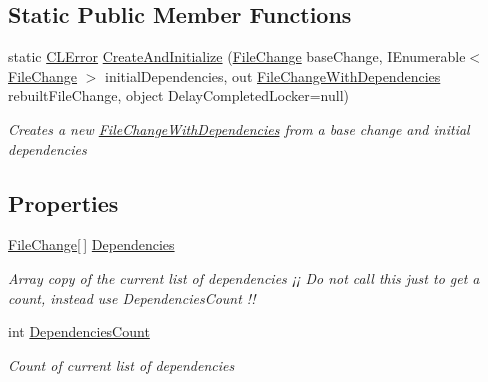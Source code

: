 \subsection*{Static Public Member Functions}
\begin{DoxyCompactItemize}
\item 
static \hyperlink{class_cloud_api_public_1_1_model_1_1_c_l_error}{C\-L\-Error} \hyperlink{class_cloud_api_public_1_1_model_1_1_file_change_with_dependencies_ac5d5eb140d1c0e90090b5c7cf5efa186}{Create\-And\-Initialize} (\hyperlink{class_cloud_api_public_1_1_model_1_1_file_change}{File\-Change} base\-Change, I\-Enumerable$<$ \hyperlink{class_cloud_api_public_1_1_model_1_1_file_change}{File\-Change} $>$ initial\-Dependencies, out \hyperlink{class_cloud_api_public_1_1_model_1_1_file_change_with_dependencies}{File\-Change\-With\-Dependencies} rebuilt\-File\-Change, object Delay\-Completed\-Locker=null)
\begin{DoxyCompactList}\small\item\em Creates a new \hyperlink{class_cloud_api_public_1_1_model_1_1_file_change_with_dependencies}{File\-Change\-With\-Dependencies} from a base change and initial dependencies \end{DoxyCompactList}\end{DoxyCompactItemize}
\subsection*{Properties}
\begin{DoxyCompactItemize}
\item 
\hyperlink{class_cloud_api_public_1_1_model_1_1_file_change}{File\-Change}\mbox{[}$\,$\mbox{]} \hyperlink{class_cloud_api_public_1_1_model_1_1_file_change_with_dependencies_ab84bcbd3ecbc8923314249d2a131502b}{Dependencies}
\begin{DoxyCompactList}\small\item\em Array copy of the current list of dependencies ¡¡ Do not call this just to get a count, instead use Dependencies\-Count !! \end{DoxyCompactList}\item 
int \hyperlink{class_cloud_api_public_1_1_model_1_1_file_change_with_dependencies_aba0e8e759d2d91d0184e9a824d31772b}{Dependencies\-Count}
\begin{DoxyCompactList}\small\item\em Count of current list of dependencies \end{DoxyCompactList}\end{DoxyCompactItemize}
